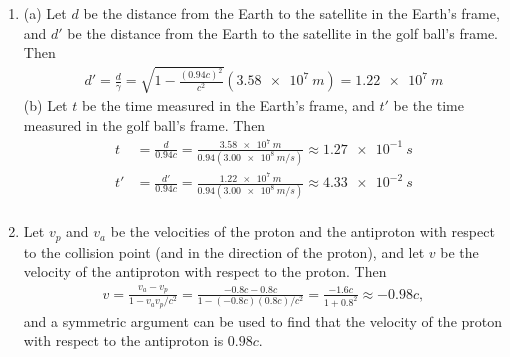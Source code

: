 \documentclass[a4paper,12pt]{article}
\begin{document}
\begin{enumerate}
	\item (a) Let $d$ be the distance from the Earth to the satellite in the Earth's frame, and $d'$ be the distance from the Earth to the satellite in the golf ball's frame. Then
	\begin{align*}
		d' = \frac{d}{\gamma} = \sqrt{1 - \frac{(0.94c)^2}{c^2}}(\SI{3.58e7}{m}) = \SI{1.22e7}{m}
	\end{align*}
	(b) Let $t$ be the time measured in the Earth's frame, and $t'$ be the time measured in the golf ball's frame. Then
	\begin{align*}
		t &= \frac{d}{0.94c} = \frac{\SI{3.58e7}{m}}{0.94(\SI{3.00e8}{m/s})} \approx \SI{1.27e-1}{s} \\
		t' &= \frac{d'}{0.94c} = \frac{\SI{1.22e7}{m}}{0.94(\SI{3.00e8}{m/s})} \approx \SI{4.33e-2}{s} \\
	\end{align*}
	
	\item Let $v_p$ and $v_a$ be the velocities of the proton and the antiproton with respect to the collision point (and in the direction of the proton), and let $v$ be the velocity of the antiproton with respect to the proton. Then
	\begin{align*}
		v = \frac{v_a - v_p}{1 - v_a v_p / c^2} = \frac{-0.8c - 0.8c}{1 - (-0.8c)(0.8c) / c^2} = \frac{-1.6c}{1 + 0.8^2} \approx -0.98 c,
	\end{align*}
	and a symmetric argument can be used to find that the velocity of the proton with respect to the antiproton is $0.98c$.	


\end{enumerate}
\end{document}
